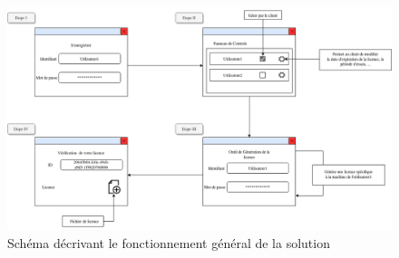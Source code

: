 \begin{figure}[t]
	\centering
	\includegraphics[width=\textwidth]{main/STB.png}
	\caption{Schéma décrivant le fonctionnement général de la solution}
	\label{fig:fig1}
\end{figure}
